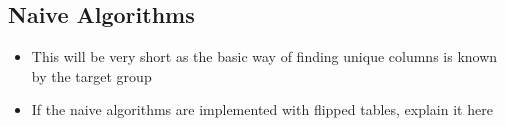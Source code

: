 \subsection{Naive Algorithms}
\begin{itemize}
  \item This will be very short as the basic way of finding unique columns is known by the target group
  \item If the naive algorithms are implemented with flipped tables, explain it here
\end{itemize}